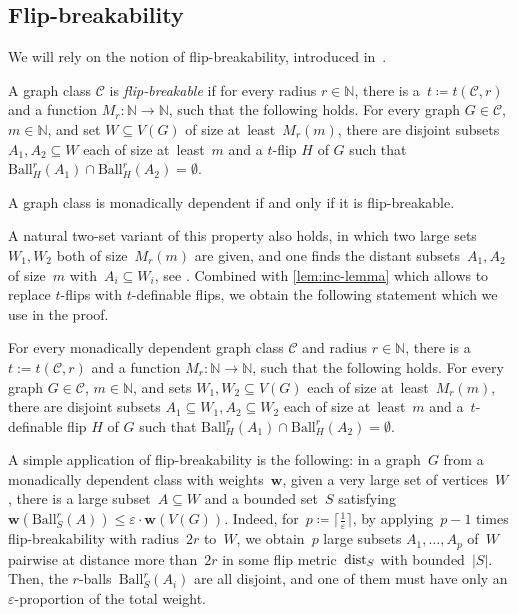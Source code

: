 \documentclass[a4paper,UKenglish,cleveref, autoref, thm-restate]{lipics-v2021}
\newcommand{\eps}{\varepsilon}
\newcommand{\N}[0]{\mathrm{\mathbb{N}}}
\renewcommand{\subset}{\subseteq}
\newcommand{\dist}{\textnormal{dist}}
\newcommand{\ceil}[1]{\lceil #1 \rceil}
\newcommand{\weight}{\mathbf{w}}
\newcommand{\CC}{\mathcal{C}}
\renewcommand{\le}{\leqslant}
\newcommand{\Ball}{\mathrm{Ball}}
\begin{document}
 

\subsection{Flip-breakability}

We will rely on the notion of flip-breakability, introduced in~\cite{flip-breakability}.

\begin{definition}\label{def:flip-breakable}
    A graph class $\CC$ is \emph{flip-breakable} if for every radius $r\in \N$, there is a~$t \coloneqq t(\CC,r)$ and a function $M_r : \N \to \N$, such that the following holds.
    For every graph $G\in\CC$, $m\in\N$, and set $W \subseteq V(G)$ of size at~least~$M_r(m)$, there are disjoint subsets $A_1, A_2 \subseteq W$ each of size at~least~$m$ and a $t$-flip $H$ of $G$ such that $\Ball_H^r(A_1) \cap \Ball_H^r(A_2) = \emptyset$.
\end{definition}

\begin{theorem}
    A graph class is monadically dependent if and only if it is flip-breakable.
\end{theorem}

A natural two-set variant of this property also holds,
in which two large sets~$W_1,W_2$ both of size~$M_r(m)$ are given, and one finds the distant subsets~$A_1,A_2$ of size~$m$ with~$A_i \subseteq W_i$, see \cite[full version, Theorem~19.14]{flip-breakability}.
Combined with \cref{lem:inc-lemma} which allows to replace $t$-flips with $t$-definable flips,
we obtain the following statement which we use in the proof.
\begin{corollary}\label{thm:flip-breakability}
    For every monadically dependent graph class $\CC$ and radius $r\in \N$, there is a~$t := t(\CC,r)$ and a function $M_r : \N \to \N$, such that the following holds.
    For every graph $G\in\CC$, $m\in\N$, and sets $W_1,W_2 \subseteq V(G)$ each of size at~least~$M_r(m)$, there are disjoint subsets $A_1 \subseteq W_1, A_2 \subseteq W_2$ each of size at~least~$m$ and a~\mbox{$t$-definable} flip $H$ of $G$ such that $\Ball_H^r(A_1) \cap \Ball_H^r(A_2) = \emptyset$.
\end{corollary}
 
A simple application of flip-breakability is the following:
in a graph~$G$ from a monadically dependent class with weights~$\weight$, given a very large set of vertices~$W$,
there is a large subset~$A \subset W$ and a bounded set~$S$ satisfying~$\weight(\Ball_S^r(A)) \le \eps \cdot \weight(V(G))$.
Indeed, for~$p \coloneqq \ceil{\frac{1}{\eps}}$, by applying~$p-1$ times flip-breakability with radius~$2r$ to~$W$,
we obtain~$p$ large subsets $A_1,\dots,A_p$ of~$W$ pairwise at distance more than~$2r$ in some flip metric~$\dist_S$ with bounded~$|S|$.
Then, the $r$-balls~$\Ball_S^r(A_i)$ are all disjoint, and one of them must have only an $\eps$-proportion of the total weight.
\end{document}
